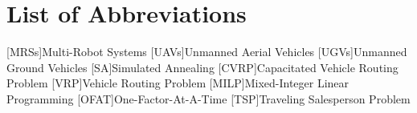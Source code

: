 \cleardoublepage
{}
\tableofcontents
\clearpage

\cleardoublepage
{}
{}
\chapter*{List of Abbreviations}
\begin{acronym}[\hspace{3cm}]
  [MRSs]{Multi-Robot Systems}
  [UAVs]{Unmanned Aerial Vehicles}
  [UGVs]{Unmanned Ground Vehicles}
  [SA]{Simulated Annealing}
  [CVRP]{Capacitated Vehicle Routing Problem}
  [VRP]{Vehicle Routing Problem}
  [MILP]{Mixed-Integer Linear Programming}
  [OFAT]{One-Factor-At-A-Time}
  [TSP]{Traveling Salesperson Problem}
\end{acronym}
\clearpage

\cleardoublepage
{}
{}
\listoffigures
\clearpage

\cleardoublepage
{}
{}
\listoftables
\clearpage
